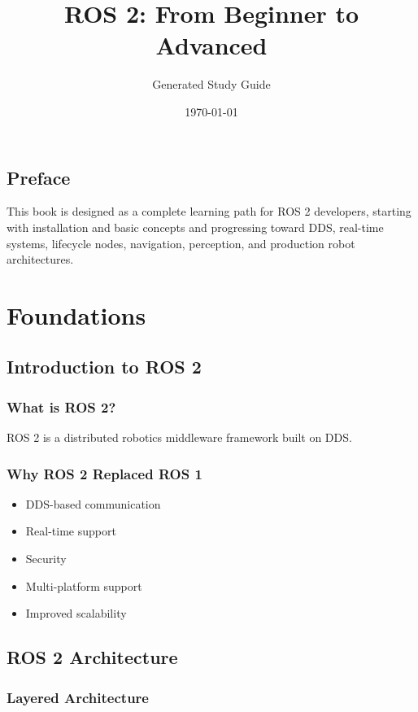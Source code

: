 \documentclass[11pt,oneside]{book}
\title{ROS 2: From Beginner to Advanced}
\author{Generated Study Guide}
\date{\today}
\begin{document}
\frontmatter
\maketitle
\tableofcontents

\chapter*{Preface}

This book is designed as a complete learning path for ROS 2 developers,
starting with installation and basic concepts and progressing toward DDS,
real-time systems, lifecycle nodes, navigation, perception, and production
robot architectures.

\mainmatter

\part{Foundations}

\chapter{Introduction to ROS 2}
\section{What is ROS 2?}
ROS 2 is a distributed robotics middleware framework built on DDS.

\section{Why ROS 2 Replaced ROS 1}
\begin{itemize}
\item DDS-based communication
\item Real-time support
\item Security
\item Multi-platform support
\item Improved scalability
\end{itemize}

\chapter{ROS 2 Architecture}

\section{Layered Architecture}
\end{document}
